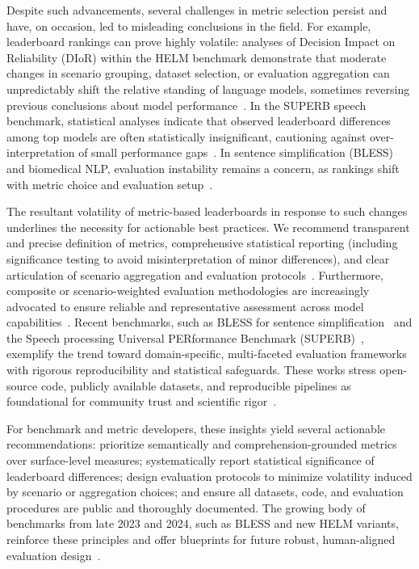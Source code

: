 \documentclass[sigconf]{acmart}
\begin{document}
Despite such advancements, several challenges in metric selection persist and have, on occasion, led to misleading conclusions in the field. For example, leaderboard rankings can prove highly volatile: analyses of Decision Impact on Reliability (DIoR) within the HELM benchmark demonstrate that moderate changes in scenario grouping, dataset selection, or evaluation aggregation can unpredictably shift the relative standing of language models, sometimes reversing previous conclusions about model performance~\cite{ref104}. In the SUPERB speech benchmark, statistical analyses indicate that observed leaderboard differences among top models are often statistically insignificant, cautioning against over-interpretation of small performance gaps~\cite{ref101}. In sentence simplification (BLESS) and biomedical NLP, evaluation instability remains a concern, as rankings shift with metric choice and evaluation setup~\cite{ref94,ref106}.

The resultant volatility of metric-based leaderboards in response to such changes underlines the necessity for actionable best practices. We recommend transparent and precise definition of metrics, comprehensive statistical reporting (including significance testing to avoid misinterpretation of minor differences), and clear articulation of scenario aggregation and evaluation protocols~\cite{ref101,ref104,ref108}. Furthermore, composite or scenario-weighted evaluation methodologies are increasingly advocated to ensure reliable and representative assessment across model capabilities~\cite{ref104,ref106,ref108}. Recent benchmarks, such as BLESS for sentence simplification~\cite{ref106} and the Speech processing Universal PERformance Benchmark (SUPERB)~\cite{ref101}, exemplify the trend toward domain-specific, multi-faceted evaluation frameworks with rigorous reproducibility and statistical safeguards. These works stress open-source code, publicly available datasets, and reproducible pipelines as foundational for community trust and scientific rigor~\cite{ref101,ref106,ref108}.

For benchmark and metric developers, these insights yield several actionable recommendations: prioritize semantically and comprehension-grounded metrics over surface-level measures; systematically report statistical significance of leaderboard differences; design evaluation protocols to minimize volatility induced by scenario or aggregation choices; and ensure all datasets, code, and evaluation procedures are public and thoroughly documented. The growing body of benchmarks from late 2023 and 2024, such as BLESS and new HELM variants, reinforce these principles and offer blueprints for future robust, human-aligned evaluation design~\cite{ref101,ref104,ref106}.
\end{document}
